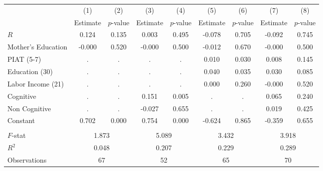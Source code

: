 \begin{tabular}{lcccccccc} \toprule
 & (1) & (2) & (3) & (4) & (5) & (6) & (7) & (8) \\ 
 & Estimate  & $p$-value  & Estimate  & $p$-value  & Estimate  & $p$-value  & Estimate  & $p$-value  \\  \midrule
$R$ &     0.124 &     0.135 &     0.003 &     0.495 &    -0.078 &     0.705 &    -0.092 &     0.745 \\  
Mother's Education &    -0.000 &     0.520 &    -0.000 &     0.500 &    -0.012 &     0.670 &    -0.000 &     0.500 \\  
PIAT (5-7) &         . &         . &         . &         . &     0.010 &     0.030 &     0.008 &     0.145 \\  
Education (30) &         . &         . &         . &         . &     0.040 &     0.035 &     0.030 &     0.085 \\  
Labor Income (21) &         . &         . &         . &         . &     0.000 &     0.260 &    -0.000 &     0.520 \\  
Cognitive &         . &         . &     0.151 &     0.005 &         . &         . &     0.065 &     0.240 \\  
Non Cognitive &         . &         . &    -0.027 &     0.655 &         . &         . &     0.019 &     0.425 \\  
Constant &     0.702 &     0.000 &     0.754 &     0.000 &    -0.624 &     0.865 &    -0.359 &     0.655 \\  \\ \midrule
$F$-stat &     \multicolumn{2}{c}{1.873} &              \multicolumn{2}{c}{5.089} &              \multicolumn{2}{c}{3.432} &              \multicolumn{2}{c}{3.918} \\  
$R^2$ &     \multicolumn{2}{c}{0.048} &              \multicolumn{2}{c}{0.207} &              \multicolumn{2}{c}{0.229} &              \multicolumn{2}{c}{0.289} \\  
Observations &    \multicolumn{2}{c}{67} &             \multicolumn{2}{c}{52} &             \multicolumn{2}{c}{65}  &             \multicolumn{2}{c}{70}   \\  \bottomrule \end{tabular}
